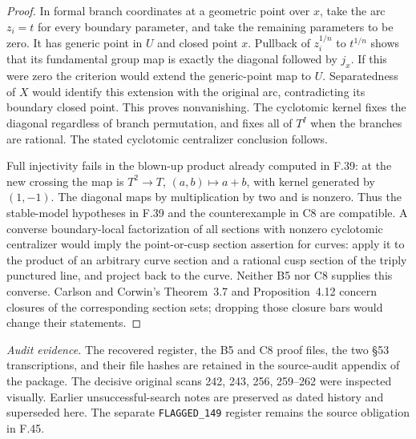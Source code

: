 \begin{proof}
In formal branch coordinates at a geometric point over $x$, take
the arc $z_i=t$ for every boundary parameter, and take the remaining
parameters to be zero. It has generic point in $U$ and closed point
$x$. Pullback of $z_i^{1/n}$ to $t^{1/n}$ shows that its fundamental
group map is exactly the diagonal followed by $j_x$. If this were
zero the criterion would extend the generic-point map to $U$.
Separatedness of $X$ would identify this extension with the original
arc, contradicting its boundary closed point. This proves
nonvanishing. The cyclotomic kernel fixes the diagonal regardless
of branch permutation, and fixes all of $T^I$ when the branches
are rational. The stated cyclotomic centralizer conclusion follows.

Full injectivity fails in the blown-up product already computed in
F.39: at the new crossing the map is
$T^2\to T$, $(a,b)\mapsto a+b$, with kernel generated by $(1,-1)$.
The diagonal maps by multiplication by two and is nonzero. Thus the
stable-model hypotheses in F.39 and the counterexample in C8 are
compatible. A converse boundary-local factorization of all sections
with nonzero cyclotomic centralizer would imply the point-or-cusp
section assertion for curves: apply it to the product of an arbitrary
curve section and a rational cusp section of the triply punctured
line, and project back to the curve. Neither B5 nor C8 supplies this
converse. Carlson and Corwin's Theorem~3.7 and Proposition~4.12
concern closures of the corresponding section sets; dropping those
closure bars would change their statements.
\end{proof}

\emph{Audit evidence.}
The recovered register, the B5 and C8 proof files, the two \S53
transcriptions, and their file hashes are retained in the source-audit
appendix of the package. The decisive original scans 242, 243, 256,
259--262 were inspected visually. Earlier unsuccessful-search notes
are preserved as dated history and superseded here. The separate
\texttt{FLAGGED\_149} register remains the source obligation in F.45.
